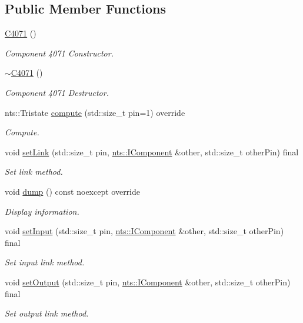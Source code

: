 \subsection*{Public Member Functions}
\begin{DoxyCompactItemize}
\item 
\mbox{\hyperlink{classC4071_ac33d5f23fd2f325b4e67c1107971e8d5}{C4071}} ()
\begin{DoxyCompactList}\small\item\em Component 4071 Constructor. \end{DoxyCompactList}\item 
\mbox{\label{classC4071_a5e437df39bafa4b93da5d66c1dcb9cb3}} 
\mbox{\hyperlink{classC4071_a5e437df39bafa4b93da5d66c1dcb9cb3}{$\sim$\+C4071}} ()
\begin{DoxyCompactList}\small\item\em Component 4071 Destructor. \end{DoxyCompactList}\item 
nts\+::\+Tristate \mbox{\hyperlink{classC4071_af027f99834e11ebf7eed3140b25011b7}{compute}} (std\+::size\+\_\+t pin=1) override
\begin{DoxyCompactList}\small\item\em Compute. \end{DoxyCompactList}\item 
void \mbox{\hyperlink{classC4071_af9bec6200cffbba1c5a9a1c904869c20}{set\+Link}} (std\+::size\+\_\+t pin, \mbox{\hyperlink{classnts_1_1IComponent}{nts\+::\+I\+Component}} \&other, std\+::size\+\_\+t other\+Pin) final
\begin{DoxyCompactList}\small\item\em Set link method. \end{DoxyCompactList}\item 
void \mbox{\hyperlink{classC4071_a495ed3223c0e31b92abb9f8c9785c789}{dump}} () const noexcept override
\begin{DoxyCompactList}\small\item\em Display information. \end{DoxyCompactList}\item 
void \mbox{\hyperlink{classC4071_a48d9c405a1d4ef621b971cdbfd48d65f}{set\+Input}} (std\+::size\+\_\+t pin, \mbox{\hyperlink{classnts_1_1IComponent}{nts\+::\+I\+Component}} \&other, std\+::size\+\_\+t other\+Pin) final
\begin{DoxyCompactList}\small\item\em Set input link method. \end{DoxyCompactList}\item 
void \mbox{\hyperlink{classC4071_abbedfad8c619e64d3f63c0a9731d82e6}{set\+Output}} (std\+::size\+\_\+t pin, \mbox{\hyperlink{classnts_1_1IComponent}{nts\+::\+I\+Component}} \&other, std\+::size\+\_\+t other\+Pin) final
\begin{DoxyCompactList}\small\item\em Set output link method. \end{DoxyCompactList}\end{DoxyCompactItemize}
